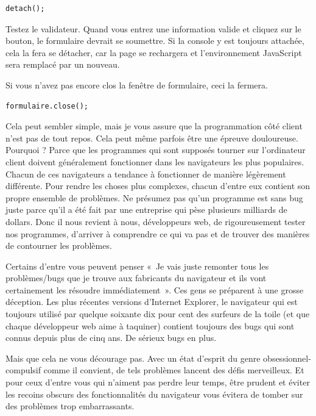 \documentclass{FramateX}
\begin{document}
\begin{lstlisting}
detach();
\end{lstlisting}
Testez le validateur. Quand vous entrez une information valide et
cliquez sur le bouton, le formulaire devrait se soumettre. Si la console
y est toujours attachée, cela la fera se détacher, car la page se
rechargera et l'environnement JavaScript sera remplacé par un nouveau.

Si vous n'avez pas encore clos la fenêtre de formulaire, ceci la
fermera.

\begin{lstlisting}
formulaire.close();
\end{lstlisting}
\begin{center}\end{center}

Cela peut sembler simple, mais je vous assure que la programmation côté
client n'est pas de tout repos. Cela peut même parfois être une épreuve
douloureuse. Pourquoi ? Parce que les programmes qui sont supposés
tourner sur l'ordinateur client doivent généralement fonctionner dans
les navigateurs les plus populaires. Chacun de ces navigateurs a
tendance à fonctionner de manière légèrement différente. Pour rendre les
choses plus complexes, chacun d'entre eux contient son propre ensemble
de problèmes. Ne présumez pas qu'un programme est sans bug juste parce
qu'il a été fait par une entreprise qui pèse plusieurs milliards de
dollars. Donc il nous revient à nous, développeurs web, de
rigoureusement tester nos programmes, d'arriver à comprendre ce qui va
pas et de trouver des manières de contourner les problèmes.

Certains d'entre vous peuvent penser «~Je vais juste remonter tous les
problèmes/bugs que je trouve aux fabricants du navigateur et ils vont
certainement les résoudre immédiatement~». Ces gens se préparent à une
grosse déception. Les plus récentes versions d'Internet Explorer, le
navigateur qui est toujours utilisé par quelque soixante dix pour cent
des surfeurs de la toile (et que chaque développeur web aime à taquiner)
contient toujours des bugs qui sont connus depuis plus de cinq ans. De
sérieux bugs en plus.

Mais que cela ne vous décourage pas. Avec un état d'esprit du genre
obsessionnel-compulsif comme il convient, de tels problèmes lancent des
défis merveilleux. Et pour ceux d'entre vous qui n'aiment pas perdre
leur temps, être prudent et éviter les recoins obscurs des
fonctionnalités du navigateur vous évitera de tomber sur des problèmes
trop embarrassants.
\end{document}
